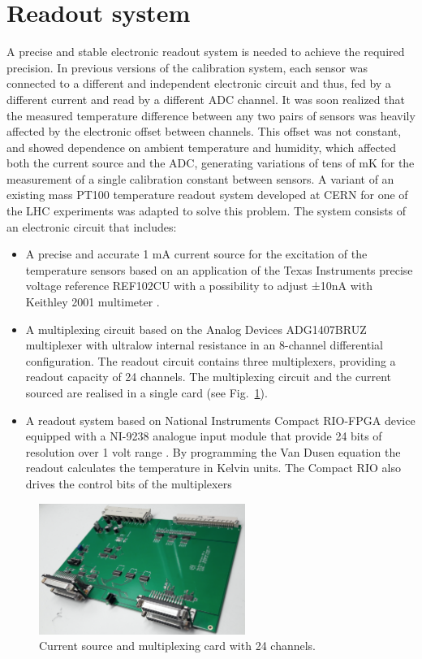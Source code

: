 \section{Readout system}
\label{sec:readout}
\noindent A precise and stable electronic readout system is needed to achieve the required precision. In previous versions of the calibration system, each sensor was connected to a different and independent electronic circuit and thus, fed by a different current and read by a different ADC channel. It was soon realized that the measured temperature difference between any two pairs of sensors was heavily affected by the electronic offset between channels. This offset was not constant, and showed dependence on ambient temperature and humidity, which affected both the current source and the ADC, generating variations of tens of mK for the measurement of a single calibration constant between sensors. A variant of an existing mass PT100 temperature readout system developed at CERN for one of the LHC experiments \cite{bib:multiplexing_board} was adapted to solve this problem. The system consists of an electronic circuit that includes:

\begin{itemize}
\item A precise and accurate 1 mA current source for the excitation of the temperature sensors based on an application of the Texas Instruments precise voltage reference REF102CU with a possibility to adjust ±10nA with Keithley 2001 multimeter \cite{xavier,keithley}.%
\item A multiplexing circuit based on the Analog Devices ADG1407BRUZ multiplexer with ultralow internal resistance in an 8-channel differential configuration. The readout circuit contains three multiplexers, providing a readout capacity of 24 channels. The multiplexing circuit and the current sourced are realised in a single card (see Fig.~\ref{fig:readout}). 
\item A readout system based on National Instruments Compact RIO-FPGA device \cite{compactrio} equipped with a NI-9238 analogue input module that provide 24 bits of resolution over 1 volt range \cite{ni9238}. By programming the Van Dusen equation the readout calculates the temperature in Kelvin units. The Compact RIO also drives the control bits of the multiplexers
\end{itemize}

\begin{figure}[htbp]
\centering
\includegraphics[width=0.6\textwidth]{images/figure_2.png}
\caption{Current source and multiplexing card with 24 channels. 
\label{fig:readout}}
\end{figure}

